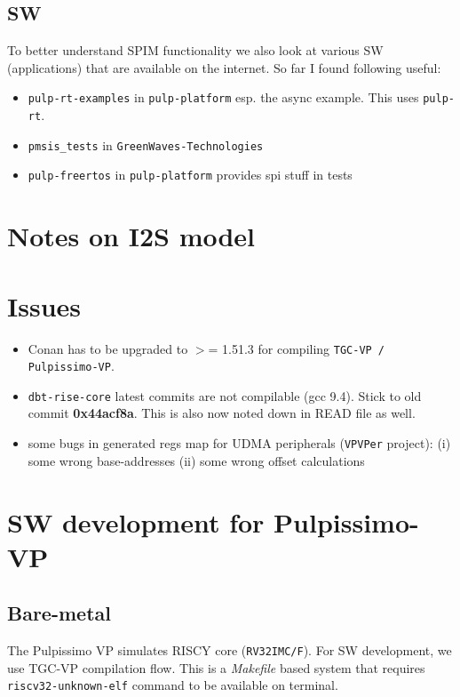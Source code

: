 \documentclass{article}
\begin{document}
\subsection{SW}
To better understand SPIM functionality we also look at various SW (applications) that are available on the internet.
So far I found following useful:
\begin{itemize}
 \item \texttt{pulp-rt-examples} in \texttt{pulp-platform} esp. the async example. This uses \texttt{pulp-rt}.
 \item  \texttt{pmsis\_tests} in \texttt{GreenWaves-Technologies}
 \item \texttt{pulp-freertos} in \texttt{pulp-platform} provides spi stuff in tests
\end{itemize}


\section{Notes on I2S model}

\section{Issues}
\begin{itemize}
 \item Conan has to be upgraded to $>$= 1.51.3 for compiling \texttt{TGC-VP / Pulpissimo-VP}.
 \item \texttt{dbt-rise-core} latest commits are not compilable (gcc 9.4). Stick to old commit \textbf{0x44acf8a}.
       This is also now noted down in READ file as well.
 \item some bugs in generated regs map for UDMA peripherals (\texttt{VPVPer} project):
       (i) some wrong base-addresses (ii) some wrong offset calculations
\end{itemize}

\section{SW development for Pulpissimo-VP}
\subsection{Bare-metal}
The Pulpissimo VP simulates RISCY core (\texttt{RV32IMC/F}). For SW development, we use
TGC-VP compilation flow. This is a \textit{Makefile} based system that requires \texttt{riscv32-unknown-elf}
command to be available on terminal.
\end{document}

